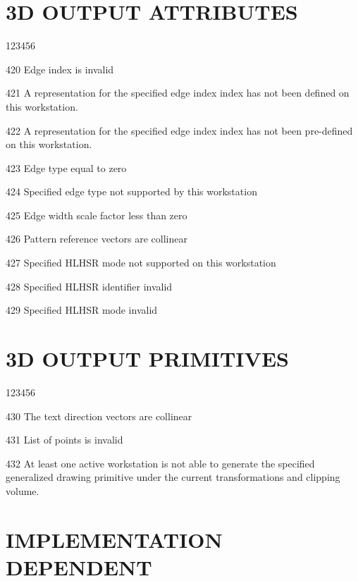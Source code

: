 \section{3D OUTPUT ATTRIBUTES}
\begin{DLtt}{123456}
\item[420]
Edge index is invalid
\item[421]
A representation for the specified edge index index has not been
defined on this workstation.
\item[422]
A representation for the specified edge index index has not been
pre-defined on this workstation.
\item[423]
Edge type equal to zero
\item[424]
Specified edge type not supported by this workstation
\item[425]
Edge width scale factor less than zero
\item[426]
Pattern reference vectors are collinear
\item[427]
Specified HLHSR mode not supported on this workstation
\item[428]
Specified HLHSR identifier invalid
\item[429]
Specified HLHSR mode invalid
\end{DLtt}
\section{3D OUTPUT PRIMITIVES}
\begin{DLtt}{123456}
\item[430]
The text direction vectors are collinear
\item[431]
List of points is invalid
\item[432]
At least one active workstation is not able to generate the specified
generalized drawing primitive under the current transformations and
clipping volume.
\end{DLtt}
\section{IMPLEMENTATION DEPENDENT}
